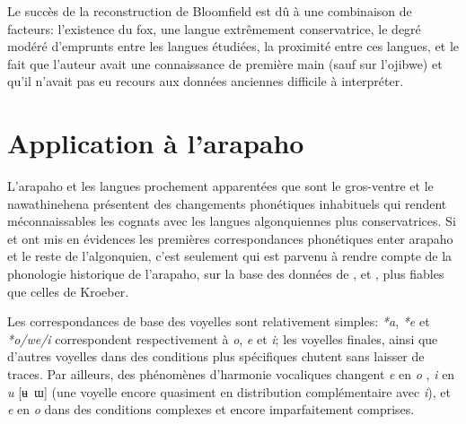 \documentclass[twoside,a4paper,11pt]{article}
\newcommand{\ipa}[1]{{\phon\textit{#1}}}
\newcommand{\Σ}{\greek{Σ}}
\begin{document}
Le succès de la reconstruction de Bloomfield  est dû à une combinaison de facteurs: l'existence du fox, une langue extrêmement conservatrice, le degré modéré d'emprunts entre les langues étudiées, la proximité entre ces langues,  et le fait que l'auteur avait une connaissance de première main (sauf sur l'ojibwe) et qu'il n'avait pas eu recours aux données anciennes difficile à interpréter.

\section{Application à l'arapaho}	
L'arapaho et les langues prochement apparentées que sont le gros-ventre et le nawathinehena présentent des changements phonétiques inhabituels qui rendent méconnaissables les cognats avec les langues algonquiennes plus conservatrices. Si \citealt{kroeber16arapaho} et \citealt{michelson35shifts} ont mis en évidences les premières correspondances phonétiques enter arapaho et le reste de l'algonquien, c'est seulement  \citet{goddard74arapaho} qui est parvenu à rendre compte de la phonologie historique de l'arapaho, sur la base des données de \citet{salzmann56phono}, \citet{salzmann63arapaho} et \citet{taylor67atsina}, plus fiables que celles de Kroeber.
 
 Les correspondances de base des voyelles sont relativement simples: \ipa{*a}, \ipa{*e} et \ipa{*o/we/i} correspondent respectivement à \ipa{o}, \ipa{e} et \ipa{i}; les voyelles finales, ainsi que d'autres voyelles dans des conditions plus spécifiques  chutent sans laisser de traces. Par ailleurs, des phénomènes d'harmonie vocaliques changent \ipa{e} en \ipa{o} , \ipa{i} en \ipa{u} [ʉ~ɯ] (une voyelle encore quasiment en distribution complémentaire avec \ipa{i}), et \ipa{e} en \ipa{o} dans des conditions complexes et encore imparfaitement comprises.
 
\end{document}
